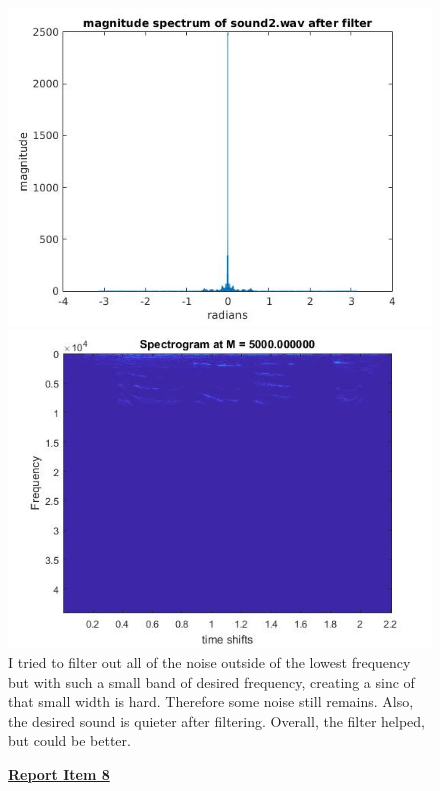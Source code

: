 \documentclass{article}
\begin{document}
\begin{figure}[H]
\includegraphics[scale = .5]{report7_3}
\includegraphics[scale = .5]{report7_4}
\\ I tried to filter out all of the noise outside of the lowest frequency but with such a small band of desired frequency, creating a sinc of that small width is hard. Therefore some noise still remains.
Also, the desired sound is quieter after filtering. Overall, the filter helped, but could be better.
\end{figure}

\begin{figure}[H]
  \color{red}
  \underline{\textbf{Report Item 8}}
  \color{black}


\end{figure}
\end{document}
